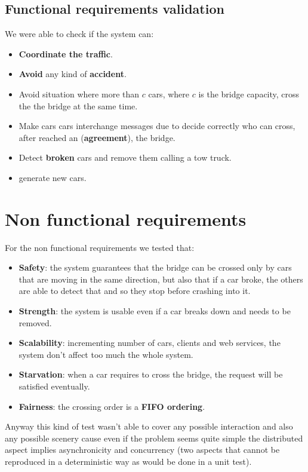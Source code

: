 \subsection{Functional requirements validation}

We were able to check if the system can:
\begin{itemize}
    \item \textbf{Coordinate the traffic}.
    \item \textbf{Avoid} any kind of \textbf{accident}.
    \item Avoid situation where more than $c$ cars, where $c$ is the bridge capacity, 
        cross the the bridge at the same time.
    \item Make cars cars interchange messages due to decide correctly who can cross, after reached an
    (\textbf{agreement}), the bridge.
    \item Detect \textbf{broken} cars and remove them calling a tow truck.
    \item generate new cars.
\end{itemize}


\section{Non functional requirements}

For the non functional requirements we tested that:
\begin{itemize}
    \item \textbf{Safety}: the system guarantees that the bridge can be crossed only by cars that 
        are moving in the same direction, but also that if a car broke, the others are able to detect that
        and so they stop before crashing into it. 
    \item \textbf{Strength}: the system is usable even if a car breaks down and needs to be removed.
    \item \textbf{Scalability}: incrementing number of cars, clients and web services, the system don't affect
    too much the whole system.
    \item \textbf{Starvation}: when a car requires to cross the bridge, the request will be satisfied 
    eventually. 
    \item \textbf{Fairness}: the crossing order is a \textbf{FIFO ordering}.
\end{itemize}

Anyway this kind of test wasn't able to cover any possible interaction and also 
any possible scenery cause even if the problem seems quite simple the distributed 
aspect implies asynchronicity and concurrency (two aspects that cannot be reproduced 
in a deterministic way as would be done in a unit test).

